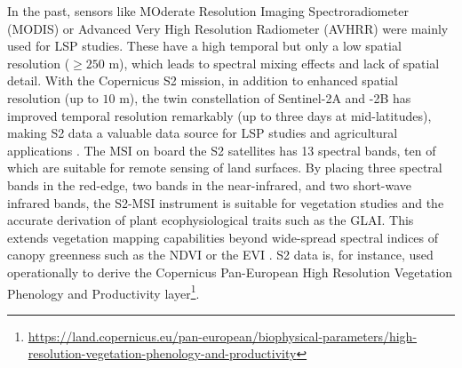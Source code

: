 In the past, sensors like MOderate Resolution Imaging Spectroradiometer (MODIS) or Advanced Very High Resolution Radiometer (AVHRR) were mainly used for \gls{LSP} studies. These have a high temporal but only a low spatial resolution ($\ge250$ m), which leads to spectral mixing effects \citep{helman_land_2018} and lack of spatial detail. With the Copernicus \gls{S2} mission, in addition to enhanced spatial resolution (up to $10$ m), the twin constellation of Sentinel-2A and -2B has improved temporal resolution remarkably (up to three days at mid-latitudes), making \gls{S2} data a valuable data source for \gls{LSP} studies and agricultural applications \citep{bolton_continental-scale_2020,tian_calibrating_2021,moon_multiscale_2021,amin_prototyping_2021,pazur_national_2022}. The \gls{MSI} on board the \gls{S2} satellites has 13 spectral bands, ten of which are suitable for remote sensing of land surfaces. By placing three spectral bands in the red-edge, two bands in the near-infrared, and two short-wave infrared bands, the \gls{S2}-\gls{MSI} instrument is suitable for vegetation studies \citep{frampton_evaluating_2013, misra_status_2020} and the accurate derivation of plant ecophysiological traits such as the \gls{GLAI}. This extends vegetation mapping capabilities beyond wide-spread spectral indices of canopy greenness such as the \gls{NDVI} \citep{rouse_monitoring_1974} or the \gls{EVI} \citep{huete_overview_2002}. \gls{S2} data is, for instance, used operationally to derive the Copernicus Pan-European High Resolution Vegetation Phenology and Productivity layer\footnote{\url{https://land.copernicus.eu/pan-european/biophysical-parameters/high-resolution-vegetation-phenology-and-productivity}}.

